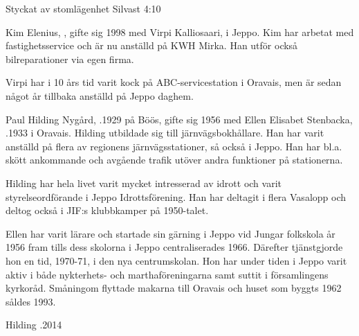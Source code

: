 %

Styckat av stomlägenhet Silvast 4:10


%
Kim Elenius, , gifte sig 1998 med Virpi Kalliosaari,  i Jeppo. Kim har arbetat med fastighetsservice och är nu anställd på KWH Mirka. Han utför också bilreparationer via egen firma.

Virpi har i 10 års tid varit kock på ABC-servicestation i Oravais, men är sedan något år tillbaka anställd på Jeppo daghem.
\begin{jhchildren}
  \item {}
  \item {}
\end{jhchildren}


%
Paul Hilding Nygård, .1929 på Böös, gifte sig 1956 med Ellen Elisabet Stenbacka, .1933 i Oravais. Hilding utbildade sig till järnvägsbokhållare. Han har varit anställd på flera av regionens järnvägsstationer, så också i Jeppo. Han har bl.a. skött ankommande och avgående trafik utöver andra  funktioner på stationerna.

Hilding har hela livet varit mycket intresserad av idrott och varit styrelseordförande i Jeppo Idrottsförening. Han har deltagit i flera Vasalopp och deltog också i JIF:s klubbkamper på 1950-talet.

Ellen har varit lärare och startade sin gärning i Jeppo vid Jungar folkskola år 1956 fram tills dess skolorna i Jeppo centraliserades 1966. Därefter tjänstgjorde hon en tid, 1970-71, i den nya centrumskolan. Hon har under tiden i Jeppo varit aktiv i både nykterhets- och marthaföreningarna samt suttit i församlingens kyrkoråd. Småningom flyttade makarna till Oravais och huset som byggts 1962 såldes 1993.

Hilding .2014



%

